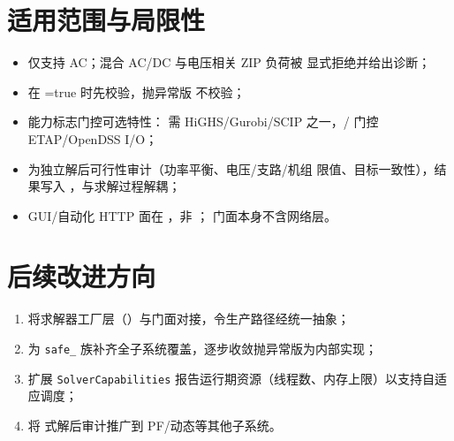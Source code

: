 \documentclass[UTF8,fontset=fandol,a4paper,11pt]{ctexart}
\begin{document}
\section{适用范围与局限性}
\begin{itemize}
  \item {} 仅支持 AC；混合 AC/DC 与电压相关 ZIP 负荷被
        显式拒绝并给出诊断；
  \item {} 在 =true 时先校验，抛异常版
         不校验；
  \item 能力标志门控可选特性： 需 HiGHS/Gurobi/SCIP
        之一，/ 门控 ETAP/OpenDSS I/O；
  \item {} 为独立解后可行性审计（功率平衡、电压/支路/机组
        限值、目标一致性），结果写入 ，与求解过程解耦；
  \item GUI/自动化 HTTP 面在 ，非 ；
        门面本身不含网络层。
\end{itemize}

\section{后续改进方向}
\begin{enumerate}
  \item 将求解器工厂层（）与门面对接，令生产路径经统一抽象；
  \item 为 \texttt{safe\_} 族补齐全子系统覆盖，逐步收敛抛异常版为内部实现；
  \item 扩展 \texttt{SolverCapabilities} 报告运行期资源（线程数、内存上限）以支持自适应调度；
  \item 将  式解后审计推广到 PF/动态等其他子系统。
\end{enumerate}


\end{document}
